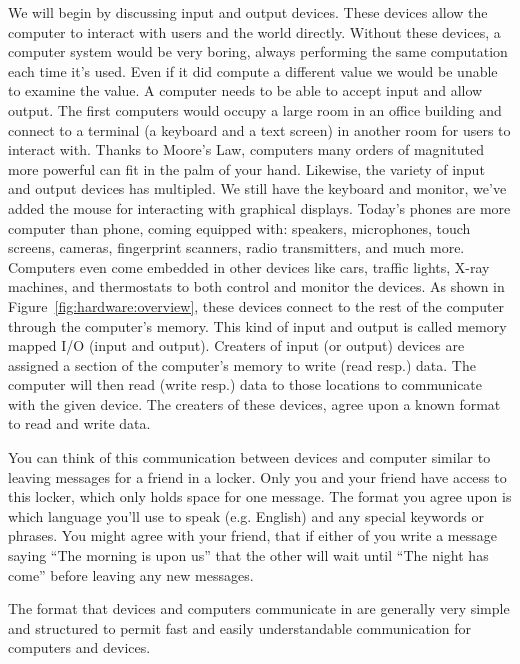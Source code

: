 We will begin by discussing input and output devices. These devices
allow the computer to interact with users and the world directly. Without
these devices, a computer system would be very boring, always performing
the same computation each time it's used. Even if it did compute a different
value we would be unable to examine the value. A computer needs to be
able to accept input and allow output. The first computers would occupy
a large room in an office building and connect to a terminal
(a keyboard and a text screen) in another room for users to interact
with. Thanks to Moore's Law, computers many orders of magnituted more
powerful can fit in the palm of your hand. Likewise, the variety of input
and output devices has multipled. We still have the keyboard and monitor,
we've added the mouse for interacting with graphical displays. Today's
phones are more computer than phone, coming equipped with: speakers,
microphones, touch screens, cameras, fingerprint scanners, radio transmitters,
and much more. Computers even come embedded in other devices like cars,
traffic lights, X-ray machines, and thermostats to both control and
monitor the devices. As shown in Figure~\ref{fig:hardware:overview},
these devices connect to the rest of the computer through the computer's memory.
This kind of input and output is called memory mapped I/O (input and output).
Creaters of input (or output) devices are assigned a section of the
computer's memory to write (read resp.) data. The computer will then read
(write resp.) data to those locations to communicate with the given device.
The creaters of these devices, agree upon a known format to read and write data.

\begin{example}
You can think of this communication between devices and computer similar to
leaving messages for a friend in a locker. Only you and your friend have
access to this locker, which only holds space for one message. The format
you agree upon is which language you'll use to speak (e.g. English) and any
special keywords or phrases. You might agree with your friend, that if either
of you write a message saying ``The morning is upon us'' that the other will
wait until ``The night has come'' before leaving any new messages.
\end {example}

The format that devices and computers communicate in are generally very simple
and structured to permit fast and easily understandable communication for
computers and devices.

